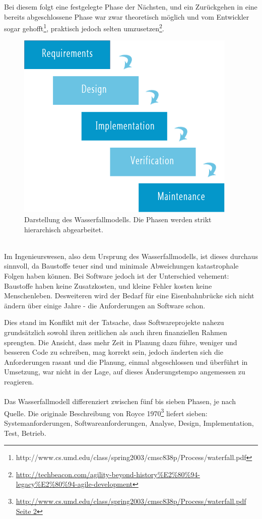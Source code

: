 		Bei diesem folgt eine festgelegte Phase der Nächsten, und ein Zurückgehen in eine bereits abgeschlossene Phase war zwar theoretisch möglich und vom Entwickler sogar gehofft\footnote{
			http://www.cs.umd.edu/class/spring2003/cmsc838p/Process/waterfall.pdf
		}, praktisch jedoch selten umzusetzen\footnote{
			\url{http://techbeacon.com/agility-beyond-history\%E2\%80\%94-legacy\%E2\%80\%94-agile-development}
		}.
		\begin{figure}[ht!]
			\begin{center}
				\includegraphics[scale=.4]{images/waterfall.png}
			\end{center}
			\caption{Darstellung des Wasserfallmodells. Die Phasen werden strikt hierarchisch abgearbeitet.}
			\label{img:waterfall}
		\end{figure}\\
		Im Ingenieurswesen, also dem Ursprung des Wasserfallmodells, ist dieses durchaus sinnvoll, da Baustoffe teuer sind und minimale Abweichungen katastrophale Folgen haben können.
		Bei Software jedoch ist der Unterschied vehement: Baustoffe haben keine Zusatzkosten, und kleine Fehler kosten keine Menschenleben.
		Desweiteren wird der Bedarf für eine Eisenbahnbrücke sich nicht ändern über einige Jahre - die Anforderungen an Software schon.
		
		Dies stand im Konflikt mit der Tatsache, dass Softwareprojekte nahezu grundsätzlich sowohl ihren zeitlichen als auch ihren finanziellen Rahmen sprengten.
		Die Ansicht, dass mehr Zeit in Planung dazu führe, weniger und besseren Code zu schreiben, mag korrekt sein, jedoch änderten sich die Anforderungen rasant und die Planung, einmal abgeschlossen und überführt in Umsetzung, war nicht in der Lage, auf dieses Änderungstempo angemessen zu reagieren.
		\\\\
		Das Wasserfallmodell differenziert zwischen fünf bis sieben Phasen, je nach Quelle.
		Die originale Beschreibung von Royce 1970\footnote{
			\url{http://www.cs.umd.edu/class/spring2003/cmsc838p/Process/waterfall.pdf Seite 2}
		} liefert sieben: Systemanforderungen, Softwareanforderungen, Analyse, Design, Implementation, Test, Betrieb.
		

